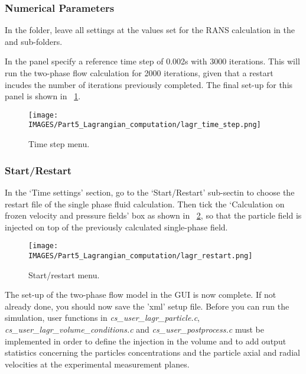 \subsubsection{Numerical Parameters}

In the  folder, leave all settings at the values set for the RANS calculation in the  and  sub-folders.

In the  panel specify a reference time step of 0.002s with 3000 iterations.  This will run the two-phase flow calculation for 2000 iterations, given that a \CS restart incudes the number of iterations previously completed.  The final set-up for this panel is shown in \figurename~\ref{lag:time_step_menu}.

\begin{figure}[H]
\centering
\texttt{[image: \\IMAGES/Part5\_Lagrangian\_computation/lagr\_time\_step.png]}
\caption{Time step menu.}\label{lag:time_step_menu}
\end{figure}


\subsubsection{Start/Restart}

In the ‘Time settings’ section, go to the ‘Start/Restart’ sub-sectin to choose the restart file of the single phase fluid calculation.  Then tick the ‘Calculation on frozen velocity and pressure fields’ box as shown in \figurename~\ref{lag:start_restart_menu}, so that the particle field is injected on top of the previously calculated single-phase field.

\begin{figure}[H]
\centering
\texttt{[image: \\IMAGES/Part5\_Lagrangian\_computation/lagr\_restart.png]}
\caption{Start/restart menu.}\label{lag:start_restart_menu}
\end{figure}

The set-up of the two-phase flow model in the GUI is now complete.  If not already done, you should now save the 'xml' setup file.  Before you can run the simulation, user functions in \textit{cs\_user\_lagr\_particle.c}, \textit{cs\_user\_lagr\_volume\_conditions.c} and \textit{cs\_user\_postprocess.c} must be implemented in order to  define the injection in the volume and to add output statistics concerning the particles concentrations and the particle axial and radial velocities at the experimental measurement planes.

